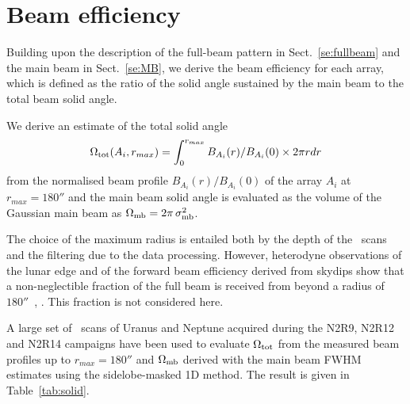 
\section{Beam efficiency}%
\label{se:beam_efficiency}

Building upon the description of the full-beam pattern in
Sect.~\ref{se:fullbeam} and the main beam in Sect.~\ref{se:MB},
we derive the beam efficiency for each array, which is defined as the
ratio of the solid angle sustained by the main beam to the total beam
solid angle.

We derive an estimate of the total solid angle
\begin{equation}
  \Omega_{\rm{tot}} (A_i, r_{max}) = \int_0^{r_{max}} B_{A_i}(r)/B_{A_i}(0) \times 2 \pi r dr
  \label{eq:omega_tot}
\end{equation}
from the normalised beam profile $B_{A_i}(r)/B_{A_i}(0)$ of the array
$A_i$  at $r_{max} = 180''$ and the main beam solid angle is
evaluated as the volume of the Gaussian main beam as
$\Omega_{\rm{mb}} = 2 \pi\,  \sigma_{\rm{mb}}^2$.

The choice of the maximum radius is entailed both by the depth of
the \bm\ scans and the filtering due to the data processing.   
However, heterodyne observations of the lunar edge and of the forward
beam efficiency derived from skydips show that a non-neglectible
fraction of the full beam is received from beyond a radius of
$180''$~\cite{Greve2010}, \cite{Kramer2013}. This fraction is not
considered here.

A large set of \bm\ scans of Uranus and Neptune acquired during the
N2R9, N2R12 and N2R14 campaigns have been used to evaluate
$\Omega_{\rm{tot}}$ from the measured beam profiles up to
$r_{max} =180''$ and $\Omega_{\rm{mb}}$  derived with the main beam FWHM
estimates using the sidelobe-masked 1D method. The result is given in
Table~\ref{tab:solid}.

